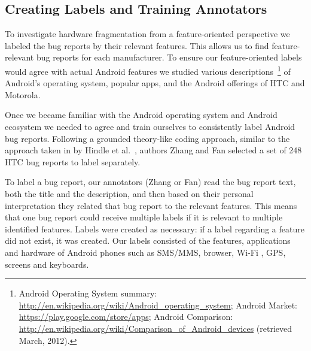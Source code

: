 \documentclass[10pt, conference, compsocconf]{IEEEtran}
\begin{document}
\subsection{Creating Labels and Training Annotators}


To investigate hardware fragmentation from a feature-oriented
perspective we labeled the bug reports by their
relevant features. This allows us to find feature-relevant bug reports
for each manufacturer.
To ensure our feature-oriented labels would agree with actual
Android features we studied various descriptions~\footnote{Android Operating System summary:
\url{http://en.wikipedia.org/wiki/Android_operating_system};
Android Market: \url{https://play.google.com/store/apps};
Android Comparison:
\url{http://en.wikipedia.org/wiki/Comparison_of_Android_devices}
(retrieved March, 2012).}
 of Android's
operating system, popular apps, and the Android offerings of HTC and
Motorola.





Once we became familiar with the Android operating system and Android
ecosystem we needed to agree and train ourselves to consistently label
Android bug reports.
Following a grounded theory-like coding approach, similar to the
approach taken in by Hindle et al.~\cite{Hindle2011}, authors Zhang
and Fan selected a set of 248 HTC bug reports to label
separately. 

To label a bug report, our annotators (Zhang or Fan) read the bug
report text, both the title and the description, and  then based on their
personal interpretation they related that bug report to the relevant
features. This means that one bug report could receive multiple labels
if it is relevant to multiple identified features. Labels were created
as necessary: if a label regarding a feature did not exist, it
was created.
Our labels 
consisted of the features, applications and hardware of Android phones
such as SMS/MMS, browser, Wi-Fi , GPS, screens and
keyboards.
\end{document}
